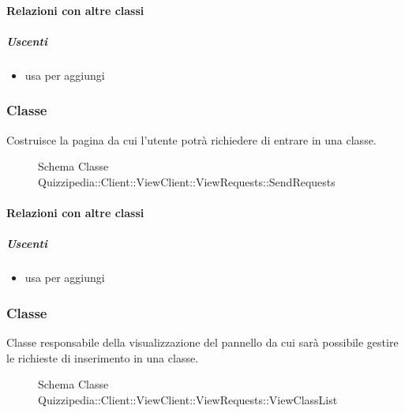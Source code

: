 \paragraph{Relazioni con altre classi}
\subparagraph{Uscenti}
\begin{itemize}
\item usa  per aggiungi
\end{itemize}
\subsubsection{Classe }
Costruisce la pagina da cui l'utente potrà richiedere di entrare in una classe.
\begin{figure}[H]
\centering
\noindent{}
\caption[Schema Classe SendRequests]{Schema Classe Quizzipedia::Client::ViewClient::ViewRequests::SendRequests}
\end{figure}
\paragraph{Relazioni con altre classi}
\subparagraph{Uscenti}
\begin{itemize}
\item usa  per aggiungi
\end{itemize}
\subsubsection{Classe }
Classe responsabile della visualizzazione del pannello da cui sarà possibile gestire le richieste di inserimento in una classe.
\begin{figure}[H]
\centering
\noindent{}
\caption[Schema Classe ViewClassList]{Schema Classe Quizzipedia::Client::ViewClient::ViewRequests::ViewClassList}
\end{figure}
